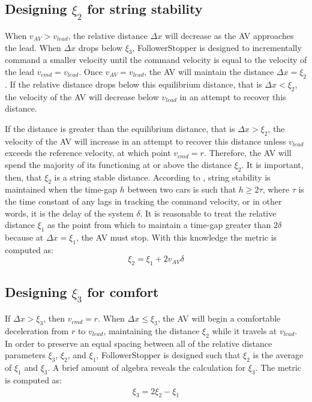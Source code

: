 \documentclass[conference]{IEEEtran}
\begin{document}
\subsection{Designing $\xi_2$ for string stability}
When $v_{AV}>v_{lead}$, the relative distance $\Delta x$ will decrease as the AV approaches the lead. When $\Delta x$ drops below $\xi_3$, FollowerStopper is designed to incrementally command a smaller velocity until the command velocity is equal to the velocity of the lead $v_{cmd}=v_{lead}$. Once $v_{AV}=v_{lead}$, the AV will maintain the distance $\Delta x=\xi_2$. If the relative distance drops below this equilibrium distance, that is $\Delta x<\xi_2$, the velocity of the AV will decrease below $v_{lead}$ in an attempt to recover this distance.

 If the distance is greater than the equilibrium distance, that is $\Delta x>\xi_2$, the velocity of the AV will increase in an attempt to recover this distance unless $v_{lead}$ exceeds the reference velocity, at which point $v_{cmd}=r$. Therefore, the AV will spend the majority of its functioning at or above the distance $\xi_2$. It is important, then, that $\xi_2$ is a string stable distance. According to \cite{rajamani2011vehicle}, string stability is maintained when the time-gap $h$ between two cars is such that $h\geq2\tau$, where $\tau$ is the time constant of any lags in tracking the command velocity, or in other words, it is the delay of the system $\delta$. It is reasonable to treat the relative distance $\xi_1$ as the point from which to maintain a time-gap greater than $2\delta$ because at $\Delta x=\xi_1$, the AV must stop. With this knowledge the metric is computed as: 
 \begin{dmath}
 \xi_2 = \xi_1 + 2v_{AV}\delta
 \end{dmath}

\subsection{Designing $\xi_3$ for comfort}
If $\Delta x>\xi_3$, then $v_{cmd}=r$. When $\Delta x\leq \xi_3$, the AV will begin a comfortable deceleration from $r$ to $v_{lead}$, maintaining the distance $\xi_2$ while it travels at $v_{lead}$. In order to preserve an equal spacing between all of the relative distance parameters $\xi_3$, $\xi_2$, and $\xi_1$, FollowerStopper is designed such that $\xi_2$ is the average of $\xi_1$ and $\xi_3$. A brief amount of algebra reveals the calculation for $\xi_3$. The metric is computed as:
\begin{eqnarray}
\xi_3 = 2\xi_2-\xi_1
\end{eqnarray}
\end{document}
